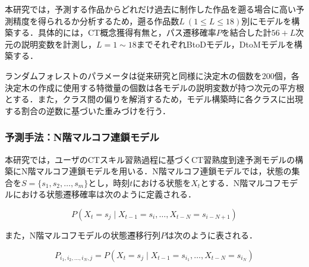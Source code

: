 \documentclass[submit,ses,noauthor]{ipsj}
\begin{document}
本研究では，予測する作品からどれだけ過去に制作した作品を遡る場合に高い予測精度を得られるか分析するため，遡る作品数$L~(1 \leq L \leq 18)$別にモデルを構築する．具体的には，CT概念獲得有無と，パス遷移確率$P$を結合した計$56+L$次元の説明変数を計測し，$L=1\sim18$までそれぞれBtoDモデル，DtoMモデルを構築する．



ランダムフォレストのパラメータは従来研究と同様に決定木の個数を200個，各決定木の作成に使用する特徴量の個数は各モデルの説明変数が持つ次元の平方根とする．また，クラス間の偏りを解消するため，モデル構築時に各クラスに出現する割合の逆数に基づいた重みづけを行う．

\subsubsection{予測手法：N階マルコフ連鎖モデル}

本研究では，ユーザのCTスキル習熟過程に基づくCT習熟度到達予測モデルの構築にN階マルコフ連鎖モデルを用いる．N階マルコフ連鎖モデルでは，状態の集合を$S=\{s_1,s_2,\ldots,s_m\}$とし，時刻$t$における状態を$X_t$とする．N階マルコフモデルにおける状態遷移確率は次のように定義される．

\begin{equation}
P(X_t=s_j\mid X_{t-1}=s_i,\ldots,X_{t-N}=s_{i-N+1})
\end{equation}

また，N階マルコフモデルの状態遷移行列$P$は次のように表される．

\begin{equation}
P_{i_1,i_2,\ldots,i_N,j}=P(X_t=s_j \mid X_{t-1} = s_{i_1}, \ldots, X_{t-N} = s_{i_N})
\end{equation}
\end{document}
